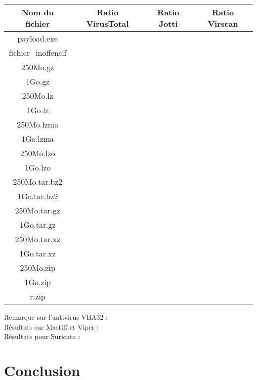 \documentclass[smallextended]{svjour3}       %
\begin{document}
\begin{tabular}{|*{4}{c|}}
    \hline
\textbf{Nom du fichier} & \textbf{Ratio VirusTotal} & \textbf{Ratio Jotti} & \textbf{Ratio Virscan} \\
	\hline
payload.exe & &   &  \\
	\hline
fichier\_inoffensif & &   &   \\
	\hline
	\hline
250Mo.gz &  &  & \\
	\hline
1Go.gz &    &  & \\
    \hline
    \hline
250Mo.lz &  &  & \\
	\hline
1Go.lz &    &  & \\
    \hline
    \hline
250Mo.lzma &  &  & \\
	\hline
1Go.lzma &  &  & \\
    \hline
    \hline
250Mo.lzo &  &  & \\
	\hline
1Go.lzo &  &  & \\
    \hline
    \hline
250Mo.tar.bz2 &  &  & \\
	\hline
1Go.tar.bz2 &  &  & \\
    \hline
    \hline
250Mo.tar.gz &  &  & \\
	\hline
1Go.tar.gz &  &  & \\
    \hline
    \hline
250Mo.tar.xz &  &  & \\
	\hline
1Go.tar.xz &  &  & \\
    \hline
    \hline
250Mo.zip &  &  & \\
	\hline
1Go.zip &  &  & \\
    \hline
    \hline
r.zip &  &  & \\
	\hline
\end{tabular}
$ $\\
Remarque sur l'antivirus VBA32 :\\
$ $\\
$ $\\
Résultats sur Mastiff et Viper :\\
$ $\\
Résultats pour Suricata :\\

\section{Conclusion}
\label{2.3ids}
\end{document}
